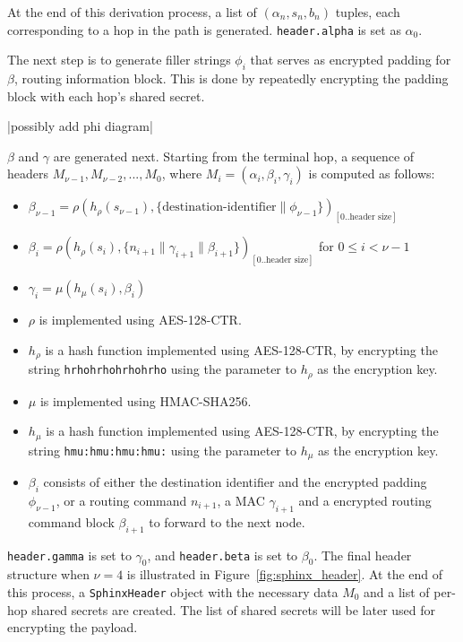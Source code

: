 \documentclass[final,dissertation.tex]{subfiles}
\begin{document}
At the end of this derivation process, a list of $(\alpha_n, s_n, b_n)$ tuples, each corresponding to a hop in the path is generated. \verb|header.alpha| is set as $\alpha_0$.

The next step is to generate filler strings $\phi_i$ that serves as encrypted padding for $\beta$, routing information block. This is done by repeatedly encrypting the padding block with each hop's shared secret.

|possibly add phi diagram|

$\beta$ and $\gamma$ are generated next. Starting from the terminal hop, a sequence of headers $M_{\nu-1},M_{\nu-2},...,M_{0}$, where $M_i = (\alpha_i, \beta_i, \gamma_i)$ is computed as follows:

\begin{itemize}
	\setlength\itemsep{-0em}
	\item $\beta_{\nu-1} = \rho(h_\rho(s_{\nu-1}), \{{\text{destination-identifier}}\|\phi_{\nu-1}\})_{[0..\text{header size}]}$
	\item $\beta_{i} = \rho(h_\rho(s_{i}), \{n_{i+1} \| \gamma_{i+1} \| \beta_{i+1}\})_{[0..\text{header size}]}$ for $0 \le i < \nu - 1$
	\item $\gamma_i = \mu(h_\mu(s_{i}), \beta_i)$
\end{itemize}

\begin{itemize}
	\item $\rho$ is implemented using AES-128-CTR.
	\item $h_\rho$ is a hash function implemented using AES-128-CTR, by encrypting the string \verb|hrhohrhohrhohrho| using the parameter to $h_\rho$ as the encryption key.
	\item $\mu$ is implemented using HMAC-SHA256.
	\item $h_\mu$ is a hash function implemented using AES-128-CTR, by encrypting the string \verb|hmu:hmu:hmu:hmu:| using the parameter to $h_\mu$ as the encryption key.
	\item $\beta_i$ consists of either the destination identifier and the encrypted padding $\phi_{\nu-1}$, or a routing command $n_{i+1}$, a MAC $\gamma_{i+1}$ and a encrypted routing command block $\beta_{i+1}$ to forward to the next node.
\end{itemize}

\verb|header.gamma| is set to $\gamma_0$, and \verb|header.beta| is set to $\beta_0$. The final header structure when $\nu = 4$ is illustrated in Figure~\ref{fig:sphinx_header}. At the end of this process, a \verb|SphinxHeader| object with the necessary data $M_0$ and a list of per-hop shared secrets are created. The list of shared secrets will be later used for encrypting the payload.
\end{document}
